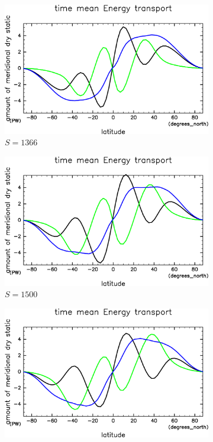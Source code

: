 \documentclass[
	paper=A4,
	tbtags,
	DVI=14,
]{scrartcl}
\begin{document}
\begin{figure}[b]
	\centering\small
	\begin{subfigure}{.17\textwidth}
		\centering
		\includegraphics[width=\columnwidth]{S1366/EngyFlx,time=14600:14965-crop-rotate.pdf}
		\caption{\(S=1366\)}
	\end{subfigure}
	\begin{subfigure}{.17\textwidth}
		\centering
		\includegraphics[width=\columnwidth]{S1500/EngyFlx,time=3650:4015-crop-rotate.pdf}
		\caption{\(S=1500\)}
	\end{subfigure}
	\begin{subfigure}{.17\textwidth}
		\centering
		\includegraphics[width=\columnwidth]{S1600/EngyFlx,time=3650:4015-crop-rotate.pdf}

\end{subfigure}
\end{figure}
\end{document}
